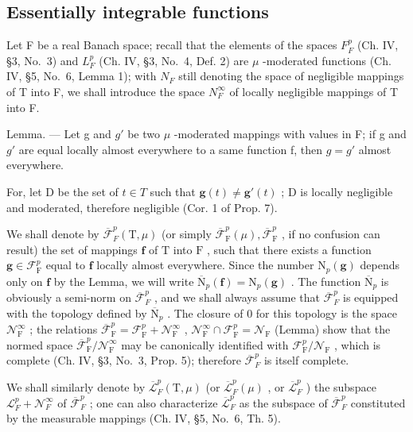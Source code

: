 \subsection{Essentially integrable functions}

Let F be a real Banach space; recall that the elements of the spaces \(F_{F}^{p}\) (Ch. IV, §3, No.~3) and \(L_{F}^{p}\) (Ch. IV, §3, No.~4, Def. 2) are \(\mu\) -moderated functions (Ch. IV, §5, No.~6, Lemma 1); with \(N_{F}\) still denoting the space of negligible mappings of T into F, we shall introduce the space \(N_{F}^{\infty}\) of locally negligible mappings of T into F.

Lemma. --- Let g and \(g'\) be two \(\mu\) -moderated mappings with values in F; if g and \(g'\) are equal locally almost everywhere to a same function f, then \(g = g'\) almost everywhere.

For, let D be the set of \(t \in T\) such that \(\mathbf{g}(t) \neq \mathbf{g}'(t)\) ; D is locally negligible and moderated, therefore negligible (Cor. 1 of Prop. 7).

We shall denote by \(\overline{\mathcal{F}}_F^p (\mathrm{T},\mu)\) (or simply \(\overline{\mathcal{F}}_{\mathrm{F}}^{p}(\mu),\overline{\mathcal{F}}_{\mathrm{F}}^{p}\) , if no confusion can result) the set of mappings \(\mathbf{f}\) of \(\mathrm{T}\) into \(\mathrm{F}\) , such that there exists a function \(\mathbf{g}\in \mathcal{F}_{\mathrm{F}}^{p}\) equal to \(\mathbf{f}\) locally almost everywhere. Since the number \(\mathrm{N}_p(\mathbf{g})\) depends only on \(\mathbf{f}\) by the Lemma, we will write \(\overline{\mathrm{N}}_p(\mathbf{f}) = \mathrm{N}_p(\mathbf{g})\) . The function \(\overline{\mathrm{N}}_p\) is obviously a semi-norm on \(\overline{\mathcal{F}}_F^p\) , and we shall always assume that \(\overline{\mathcal{F}}_F^p\) is equipped with the topology defined by \(\overline{\mathrm{N}}_p\) . The closure of 0 for this topology is the space \(\mathcal{N}_{\mathrm{F}}^{\infty}\) ; the relations \(\overline{\mathcal{F}}_{\mathrm{F}}^{p} = \mathcal{F}_{\mathrm{F}}^{p} + \mathcal{N}_{\mathrm{F}}^{\infty}\) , \(\mathcal{N}_{\mathrm{F}}^{\infty}\cap \mathcal{F}_{\mathrm{F}}^{p} = \mathcal{N}_{\mathrm{F}}\) (Lemma) show that the normed space \(\overline{\mathcal{F}}_{\mathrm{F}}^{p} / \mathcal{N}_{\mathrm{F}}^{\infty}\) may be canonically identified with \(\mathcal{F}_{\mathrm{F}}^{p} / \mathcal{N}_{\mathrm{F}}\) , which is complete (Ch. IV, §3, No.~3, Prop. 5); therefore \(\overline{\mathcal{F}}_F^p\) is itself complete.

We shall similarly denote by \(\overline{\mathcal{L}}_F^p (\mathrm{T},\mu)\) (or \(\overline{\mathcal{L}}_F^p (\mu)\) , or \(\overline{\mathcal{L}}_F^p\) ) the subspace \(\mathcal{L}_F^p +\mathcal{N}_F^\infty\) of \(\overline{\mathcal{F}}_F^p\) ; one can also characterize \(\overline{\mathcal{L}}_F^p\) as the subspace of \(\overline{\mathcal{F}}_F^p\) constituted by the measurable mappings (Ch. IV, §5, No.~6, Th. 5).

